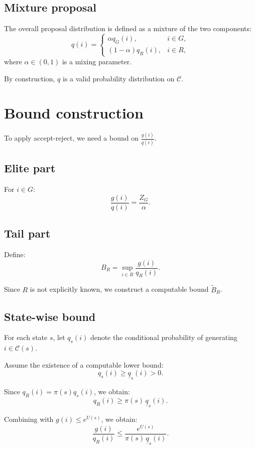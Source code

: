 \documentclass[11pt]{article}
\begin{document}
\subsection{Mixture proposal}

The overall proposal distribution is defined as a mixture of the two components:
\[
q(i) =
\begin{cases}
\alpha q_G(i), & i \in G, \\
(1-\alpha) q_R(i), & i \in R,
\end{cases}
\]
where $\alpha \in (0,1)$ is a mixing parameter.

By construction, $q$ is a valid probability distribution on $\mathcal{C}$.

\section{Bound construction}

To apply accept-reject, we need a bound on $\frac{g(i)}{q(i)}$.

\subsection{Elite part}

For $i \in G$:
\[
\frac{g(i)}{q(i)} = \frac{Z_G}{\alpha}.
\]

\subsection{Tail part}

Define:
\[
B_R = \sup_{i \in R} \frac{g(i)}{q_R(i)}.
\]

Since $R$ is not explicitly known, we construct a computable bound $\widetilde{B}_R$.

\subsection{State-wise bound}

For each state $s$, let $q_s(i)$ denote the conditional probability of generating $i \in \mathcal{C}(s)$.

Assume the existence of a computable lower bound:
\[
q_s(i) \ge \underline{q}_s(i) > 0.
\]

Since $q_R(i) = \pi(s) q_s(i)$, we obtain:
\[
q_R(i) \ge \pi(s)\,\underline{q}_s(i).
\]

Combining with $g(i) \le e^{U(s)}$, we obtain:
\[
\frac{g(i)}{q_R(i)}
\le
\frac{e^{U(s)}}{\pi(s)\,\underline{q}_s(i)}.
\]
\end{document}
